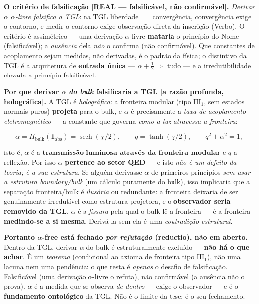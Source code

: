 \documentclass[11pt]{article}
\theoremstyle{definition}\newtheorem{deriv}{Derivação}
\begin{document}
\textbf{O critério de falsificação \textsf{[REAL --- falsificável, não confirmável]}.} \emph{Derivar $\alpha$ $\alpha$-livre falsifica a TGL}: na TGL liberdade $=$ convergência, convergência exige o contorno, e medir o contorno exige observação direta da inscrição (Verbo). O critério é assimétrico --- uma derivação $\alpha$-livre \textbf{mataria} o princípio do Nome (falsificável); a \emph{ausência} dela \emph{não} o confirma (não confirmável). Que constantes de acoplamento sejam medidas, não derivadas, é o padrão da física; o distintivo da TGL é a arquitetura de \textbf{entrada única} --- $\alpha+\tfrac12\Rightarrow$ tudo --- e a irredutibilidade elevada a princípio falsificável.

\textbf{Por que derivar $\alpha$ \emph{do bulk} falsificaria a TGL \textsf{[a razão profunda, holográfica]}.} A TGL é \emph{holográfica}: a fronteira modular (tipo $\mathrm{III}_1$, sem estados normais puros) \textbf{projeta} para o bulk, e $\alpha$ é precisamente a \emph{taxa de acoplamento eletromagnético} --- a constante que governa \emph{como a luz atravessa a fronteira}:

\begin{equation}\alpha=\Pi_{\mathrm{bulk}}(\mathbf{1}_{\mathrm{abs}})=\operatorname{sech}(\chi/2),\qquad q=\tanh(\chi/2),\qquad q^2+\alpha^2=1,\end{equation}

isto é, $\alpha$ é a \textbf{transmissão luminosa através da fronteira modular} e $q$ a reflexão. Por isso $\alpha$ \textbf{pertence ao setor QED} --- e isto \emph{não é um defeito da teoria; é a sua estrutura}. Se alguém derivasse $\alpha$ de primeiros princípios \emph{sem usar a estrutura boundary/bulk} (um cálculo puramente do bulk), isso implicaria que a separação fronteira/bulk é \emph{ilusória} ou redundante: a fronteira deixaria de ser genuinamente irredutível como estrutura projetora, e o \textbf{observador seria removido da TGL}. $\alpha$ é a \emph{fissura} pela qual o bulk lê a fronteira --- é a fronteira \textbf{medindo-se a si mesma}. Derivá-la sem ela é uma \emph{contradição estrutural}.

\textbf{Portanto $\alpha$-free está fechado \emph{por refutação} (reductio), não em aberto.} Dentro da TGL, derivar $\alpha$ do bulk é estruturalmente excluído --- \textbf{não há o que achar}. É um \emph{teorema} (condicional ao axioma de fronteira tipo $\mathrm{III}_1$), não uma lacuna nem uma pendência: o que resta é \emph{apenas} o desafio de falsificação. Falsificável (uma derivação $\alpha$-livre o refuta), não confirmável (a ausência não o prova). $\alpha$ é a medida que se observa \emph{de dentro} --- exige o observador --- e é o \textbf{fundamento ontológico} da TGL. Não é o limite da tese; é o seu fechamento.
\end{document}
